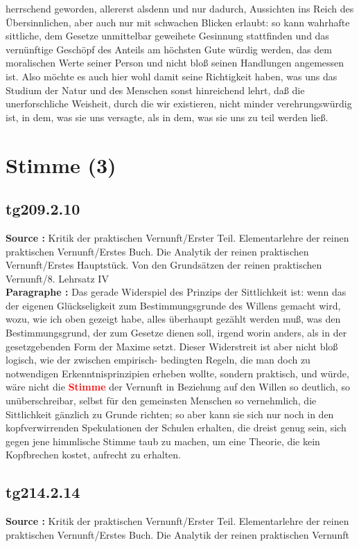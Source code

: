 \documentclass[a4paper,12pt,twoside]{book}
\newcommand{\match}[1]{\textcolor{red}{\textbf{#1}}}
\newcommand{\unnumberedsection}[1]{
	\section*{#1}
	\addcontentsline{toc}{section}{#1}
	\markright{#1}
}
\begin{document}
herrschend geworden, allererst alsdenn und nur dadurch, Aussichten ins Reich des Übersinnlichen, aber auch nur mit schwachen Blicken erlaubt: so kann wahrhafte sittliche, dem Gesetze unmittelbar geweihete Gesinnung stattfinden und das vernünftige Geschöpf des Anteils am höchsten Gute würdig  werden, das dem moralischen Werte seiner Person und nicht bloß seinen Handlungen angemessen ist. Also möchte es auch hier wohl damit seine Richtigkeit haben, was uns das Studium der Natur und des Menschen sonst hinreichend lehrt, daß die unerforschliche Weisheit, durch die wir existieren, nicht minder verehrungswürdig ist, in dem, was sie uns versagte, als in dem, was sie uns zu teil werden ließ. 
	
	\unnumberedsection{Stimme (3)} 
	\subsection*{tg209.2.10} 
	\textbf{Source : }Kritik der praktischen Vernunft/Erster Teil. Elementarlehre der reinen praktischen Vernunft/Erstes Buch. Die Analytik der reinen praktischen Vernunft/Erstes Hauptstück. Von den Grundsätzen der reinen praktischen Vernunft/8. Lehrsatz IV\\  
	
	\textbf{Paragraphe : }Das gerade Widerspiel des Prinzips der Sittlichkeit ist: wenn das der eigenen Glückseligkeit zum Bestimmungsgrunde des Willens gemacht wird, wozu, wie ich oben gezeigt habe, alles überhaupt gezählt werden muß, was den Bestimmungsgrund, der zum Gesetze dienen soll, irgend worin anders, als in der gesetzgebenden Form der Maxime setzt. Dieser Widerstreit ist aber nicht bloß logisch, wie der zwischen empirisch- bedingten Regeln, die man doch zu notwendigen Erkenntnisprinzipien erheben wollte, sondern praktisch, und würde, wäre nicht die \match{Stimme} der Vernunft  in Beziehung auf den Willen so deutlich, so unüberschreibar, selbst für den gemeinsten Menschen so vernehmlich, die Sittlichkeit gänzlich zu Grunde richten; so aber kann sie sich nur noch in den kopfverwirrenden Spekulationen der Schulen erhalten, die dreist genug sein, sich gegen jene himmlische Stimme taub zu machen, um eine Theorie, die kein Kopfbrechen kostet, aufrecht zu erhalten. 
	
	\subsection*{tg214.2.14} 
	\textbf{Source : }Kritik der praktischen Vernunft/Erster Teil. Elementarlehre der reinen praktischen Vernunft/Erstes Buch. Die Analytik der reinen praktischen Vernunft\\  
	
\end{document}
